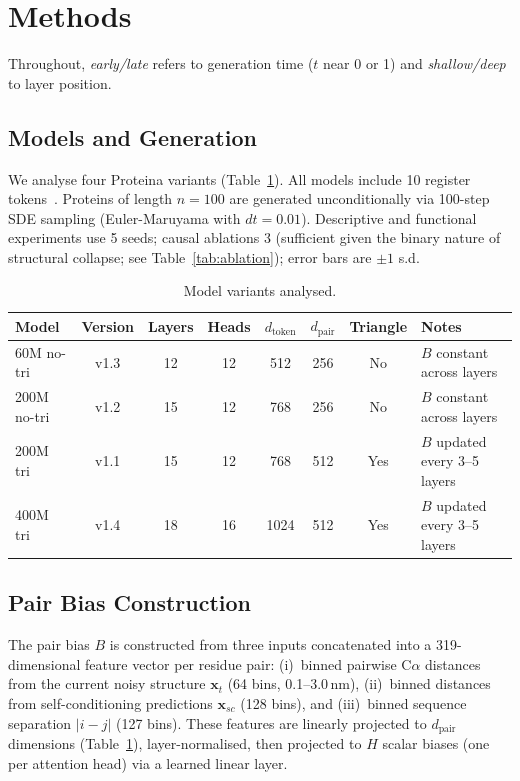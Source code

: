 \documentclass{article}
\begin{document}
\section{Methods}
\label{sec:methods}

Throughout, \emph{early/late} refers to generation time ($t$ near 0 or 1) and \emph{shallow/deep} to layer position.

\subsection{Models and Generation}

We analyse four Proteina variants (Table~\ref{tab:models}).
All models include 10 register tokens~\citep{darcet2024registers}.
Proteins of length $n{=}100$ are generated unconditionally via 100-step SDE sampling (Euler-Maruyama with $dt{=}0.01$).
Descriptive and functional experiments use 5 seeds; causal ablations 3 (sufficient given the binary nature of structural collapse; see Table~\ref{tab:ablation}); error bars are $\pm 1$ s.d.

\begin{table}[h]
    \centering
    \caption{Model variants analysed.}
    \label{tab:models}
    \begin{tabular}{lccccccp{3.8cm}}
        \toprule
        Model & Version & Layers & Heads & $d_\text{token}$ & $d_\text{pair}$ & Triangle & Notes \\
        \midrule
        60M no-tri & v1.3 & 12 & 12 & 512 & 256 & No & $B$ constant across layers \\
        200M no-tri & v1.2 & 15 & 12 & 768 & 256 & No & $B$ constant across layers \\
        200M tri & v1.1 & 15 & 12 & 768 & 512 & Yes & $B$ updated every 3--5 layers \\
        400M tri & v1.4 & 18 & 16 & 1024 & 512 & Yes & $B$ updated every 3--5 layers \\
        \bottomrule
    \end{tabular}
\end{table}

\subsection{Pair Bias Construction}

The pair bias $B$ is constructed from three inputs concatenated into a 319-dimensional feature vector per residue pair: (i)~binned pairwise C$\alpha$ distances from the current noisy structure $\mathbf{x}_t$ (64 bins, 0.1--3.0\,nm), (ii)~binned distances from self-conditioning predictions $\mathbf{x}_{sc}$ (128 bins), and (iii)~binned sequence separation $|i{-}j|$ (127 bins).
These features are linearly projected to $d_\text{pair}$ dimensions (Table~\ref{tab:models}), layer-normalised, then projected to $H$ scalar biases (one per attention head) via a learned linear layer.
\end{document}
